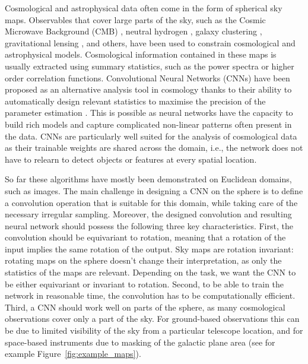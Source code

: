 \documentclass[final,twocolumn,3p,times,sort&compress]{elsarticle}
\newcommand{\figref}[1]{Figure~\ref{fig:#1}}
\newcommand{\1}{\b{1}}              %
\newcommand{\0}{\b{0}}              %
\begin{document}
Cosmological and astrophysical data often come in the form of spherical sky maps.
Observables that cover large parts of the sky, such as the Cosmic Microwave Background (CMB) \citep{planck2015cosmologicalparameters,komatsu2011sevenyear,staggs2018recentdiscoveries}, neutral hydrogen \citep{santos2015cosmologySKA,HI4PI2016fullskyHI}, galaxy clustering \citep{alam2017clusteringgalaxies}, gravitational lensing \citep{troxel2017darkenergy,hildebrandt2017kidscosmological}, and others, have been used to constrain cosmological and astrophysical models.
Cosmological information contained in these maps is usually extracted using summary statistics, such as the power spectra or higher order correlation functions.
Convolutional Neural Networks (CNNs) have been proposed as an alternative analysis tool in cosmology thanks to their ability to automatically design relevant statistics to maximise the precision of the parameter estimation
\citep{schmelze2017cosmologicalmodel,luciesmith2018machinelearning,gupta2018nongaussianinformation,gillet2018deeplearning,hassan2018reionizationmodels,aragoncalvo2018classyfyinglarge,ciuca2017cnnstring,ravanbakhsh2017estimating}.
This is possible as neural networks have the capacity to build rich models and capture complicated non-linear patterns often present in the data.
CNNs are particularly well suited for the analysis of cosmological data as their trainable weights are shared across the domain, i.e., the network does not have to relearn to detect objects or features at every spatial location.


So far these algorithms have mostly been demonstrated on Euclidean domains, such as images.
The main challenge in designing a CNN on the sphere is to define a convolution operation that is suitable for this domain, while taking care of the necessary irregular sampling.
Moreover, the designed convolution and resulting neural network should possess the following three key characteristics.
First, the convolution should be equivariant to rotation, meaning that a rotation of the input implies the same rotation of the output.
Sky maps are rotation invariant: rotating maps on the sphere doesn't change their interpretation, as only the statistics of the maps are relevant.
Depending on the task, we want the CNN to be either equivariant or invariant to rotation.
Second, to be able to train the network in reasonable time, the convolution has to be computationally efficient.
Third, a CNN should work well on parts of the sphere, as many cosmological observations cover only a part of the sky.
For ground-based observations this can be due to limited visibility of the sky from a particular telescope location, and for space-based instruments due to masking of the galactic plane area (see for example \figref{example_maps}).
\end{document}

